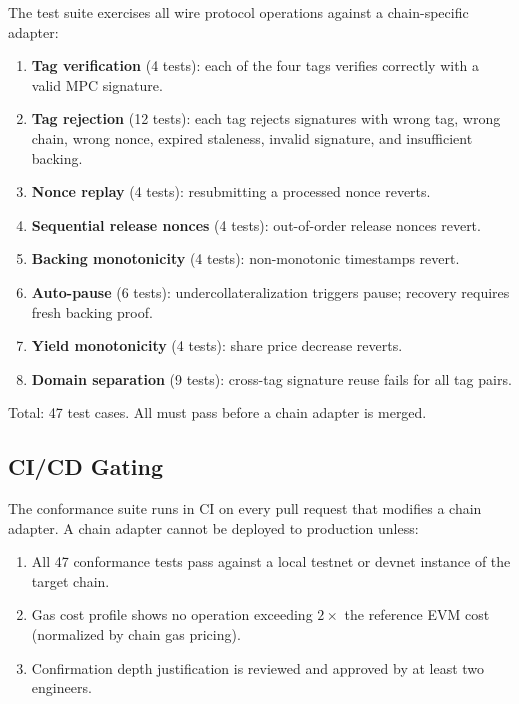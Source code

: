 \documentclass[11pt]{article}
\begin{document}
The test suite exercises all wire protocol operations against a chain-specific adapter:

\begin{enumerate}[nosep]
  \item \textbf{Tag verification} (4 tests): each of the four tags verifies correctly with a valid MPC signature.
  \item \textbf{Tag rejection} (12 tests): each tag rejects signatures with wrong tag, wrong chain, wrong nonce, expired staleness, invalid signature, and insufficient backing.
  \item \textbf{Nonce replay} (4 tests): resubmitting a processed nonce reverts.
  \item \textbf{Sequential release nonces} (4 tests): out-of-order release nonces revert.
  \item \textbf{Backing monotonicity} (4 tests): non-monotonic timestamps revert.
  \item \textbf{Auto-pause} (6 tests): undercollateralization triggers pause; recovery requires fresh backing proof.
  \item \textbf{Yield monotonicity} (4 tests): share price decrease reverts.
  \item \textbf{Domain separation} (9 tests): cross-tag signature reuse fails for all tag pairs.
\end{enumerate}

Total: 47 test cases. All must pass before a chain adapter is merged.

\subsection{CI/CD Gating}

The conformance suite runs in CI on every pull request that modifies a chain adapter. A chain adapter cannot be deployed to production unless:

\begin{enumerate}[nosep]
  \item All 47 conformance tests pass against a local testnet or devnet instance of the target chain.
  \item Gas cost profile shows no operation exceeding $2\times$ the reference EVM cost (normalized by chain gas pricing).
  \item Confirmation depth justification is reviewed and approved by at least two engineers.
\end{enumerate}

\end{document}
